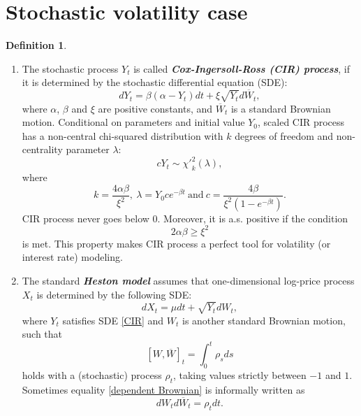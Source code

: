 \documentclass[a4paper,11pt]{article}
\theoremstyle{plain}
\theoremstyle{definition}
\newtheorem{defn}[thm]{Definition}
\newcommand{\define}[1]{\textit{\textbf{#1}}}
\begin{document}
    \section*{Stochastic volatility case}
    \begin{defn} \
    	\begin{enumerate}
    		\item 
    		The stochastic process $Y_t$ is called \define{Cox-Ingersoll-Ross (CIR) process}, if it is determined by the stochastic differential equation (SDE):
    		\begin{equation} \label{CIR}
    		    dY_t = \beta(\alpha - Y_t)dt + \xi\sqrt{Y_t}d \overline{W}_t,
    		\end{equation}
    		where $\alpha$, $\beta$ and $\xi$ are positive constants, and $\overline{W}_t$ is a standard Brownian motion. Conditional on parameters and initial value $Y_0$, scaled CIR process has a non-central chi-squared distribution with $k$ degrees of freedom and non-centrality parameter $\lambda$:
    		\[ c Y_t \sim {\chi'}_k^2(\lambda),  \]
    		where
    		\[k = \frac{4\alpha \beta}{\xi^2},\ \lambda = Y_0 c e^{-\beta t} \ \text{and} \ c = \frac{4 \beta}{\xi^2 (1-e^{-\beta t})}.\]
    		CIR process never goes below $0$. Moreover, it is a.s. positive if the condition
    		\[ 2\alpha \beta \geq \xi^2  \]
    		is met. This property makes CIR process a perfect tool for volatility (or interest rate) modeling.
    		\item The standard \define{Heston model} assumes that one-dimensional log-price process $X_t$ is determined by the following SDE:
    		\begin{equation}
    		dX_t = \mu dt + \sqrt{Y_t}d{W}_t,
    		\end{equation}
    		where $Y_t$ satisfies SDE \eqref{CIR} and ${W}_t$ is another standard Brownian motion, such that 
    		\begin{equation} \label{dependent Brownian}
    		[{W}, \overline{W}]_t = \int_{0}^{t}\rho_s ds
    		\end{equation}
    		holds with a (stochastic) process $\rho_t$, taking values strictly between $-1$ and $1$. Sometimes equality \eqref{dependent Brownian} is informally written as
    		\[ d{W}_td\overline{W}_t = \rho_t dt. \]
    	\end{enumerate}
    \end{defn}
    
\end{document}
